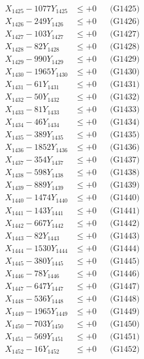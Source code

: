\documentclass[a4paper,10pt]{article}
\begin{document}
{\begin{align}
X_{1425} - 1077Y_{1425} &\leq +0 && \text{(G1425)} \\
X_{1426} - 249Y_{1426} &\leq +0 && \text{(G1426)} \\
X_{1427} - 103Y_{1427} &\leq +0 && \text{(G1427)} \\
X_{1428} - 82Y_{1428} &\leq +0 && \text{(G1428)} \\
X_{1429} - 990Y_{1429} &\leq +0 && \text{(G1429)} \\
X_{1430} - 1965Y_{1430} &\leq +0 && \text{(G1430)} \\
\allowbreak
X_{1431} - 61Y_{1431} &\leq +0 && \text{(G1431)} \\
X_{1432} - 50Y_{1432} &\leq +0 && \text{(G1432)} \\
X_{1433} - 81Y_{1433} &\leq +0 && \text{(G1433)} \\
X_{1434} - 46Y_{1434} &\leq +0 && \text{(G1434)} \\
X_{1435} - 389Y_{1435} &\leq +0 && \text{(G1435)} \\
X_{1436} - 1852Y_{1436} &\leq +0 && \text{(G1436)} \\
X_{1437} - 354Y_{1437} &\leq +0 && \text{(G1437)} \\
X_{1438} - 598Y_{1438} &\leq +0 && \text{(G1438)} \\
X_{1439} - 889Y_{1439} &\leq +0 && \text{(G1439)} \\
X_{1440} - 1474Y_{1440} &\leq +0 && \text{(G1440)} \\
\allowbreak
X_{1441} - 143Y_{1441} &\leq +0 && \text{(G1441)} \\
X_{1442} - 667Y_{1442} &\leq +0 && \text{(G1442)} \\
X_{1443} - 82Y_{1443} &\leq +0 && \text{(G1443)} \\
X_{1444} - 1530Y_{1444} &\leq +0 && \text{(G1444)} \\
X_{1445} - 380Y_{1445} &\leq +0 && \text{(G1445)} \\
X_{1446} - 78Y_{1446} &\leq +0 && \text{(G1446)} \\
X_{1447} - 647Y_{1447} &\leq +0 && \text{(G1447)} \\
X_{1448} - 536Y_{1448} &\leq +0 && \text{(G1448)} \\
X_{1449} - 1965Y_{1449} &\leq +0 && \text{(G1449)} \\
X_{1450} - 703Y_{1450} &\leq +0 && \text{(G1450)} \\
\allowbreak
X_{1451} - 569Y_{1451} &\leq +0 && \text{(G1451)} \\
X_{1452} - 16Y_{1452} &\leq +0 && \text{(G1452)} \\

\end{align}}
\end{document}
